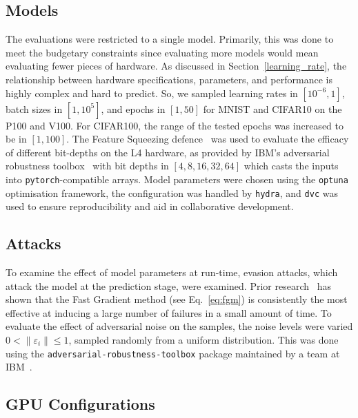 \documentclass[conference]{IEEEtran}%
\begin{document}
\subsection{Models}

The evaluations were restricted to a single model. Primarily, this was done to meet the budgetary constraints since evaluating more models would mean evaluating fewer pieces of hardware. 
As discussed in Section~\ref{learning_rate}, the relationship between hardware specifications, parameters, and performance is highly complex and hard to predict. 
So, we sampled learning rates in $[10^{-6}, 1]$, batch sizes in $[1, 10^5]$, and epochs in $[1, 50]$ for MNIST and CIFAR10 on the P100 and V100. For CIFAR100, the range of the tested epochs was increased to be in $[1, 100]$. 
The Feature Squeezing defence~\cite{feature_squeezing} was used to evaluate the efficacy of different bit-depths on the L4 hardware, as provided by IBM's adversarial robustness toolbox~\cite{art2018} with bit depths in $[4,8,16,32,64]$ which casts the inputs into \texttt{pytorch}-compatible arrays. Model parameters were chosen using the \texttt{optuna} optimisation framework, the configuration was handled by \texttt{hydra}, and \texttt{dvc} was used to ensure reproducibility and aid in collaborative development.


\subsection{Attacks}

To examine the effect of model parameters at run-time, evasion attacks, which attack the model at the prediction stage, were examined.
Prior research~\cite{meyers,meyers_aft} has shown that the Fast Gradient method (see Eq.~\ref{eq:fgm}) is consistently the most effective at inducing a large number of failures in a small amount of time.
To evaluate the effect of adversarial noise on the samples, the noise levels were varied $0 < \|\varepsilon_i\| \leq 1$, sampled randomly from a uniform distribution.
This was done using the \texttt{adversarial-robustness-toolbox} package maintained by a team at IBM~\cite{art2018}.


\subsection{GPU Configurations}
\end{document}
